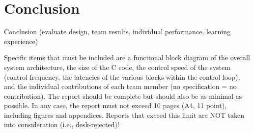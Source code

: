 \documentclass[final]{article}
\begin{document}
\section{Conclusion}
Conclusion (evaluate design, team results, individual performance, learning experience)

{ \color{red} Specific items that must be included are a functional block diagram of the overall system architecture, the size of the C code, the control speed of the system (control frequency, the latencies of the various blocks within the control loop), and the individual contributions of each team member (no specification = no contribution). The report should be complete but should also be as minimal as possible. In any case, the report must not exceed 10 pages (A4, 11 point), including figures and appendices. Reports that exceed this limit are NOT taken into consideration (i.e., desk-rejected)!}
\end{document}
